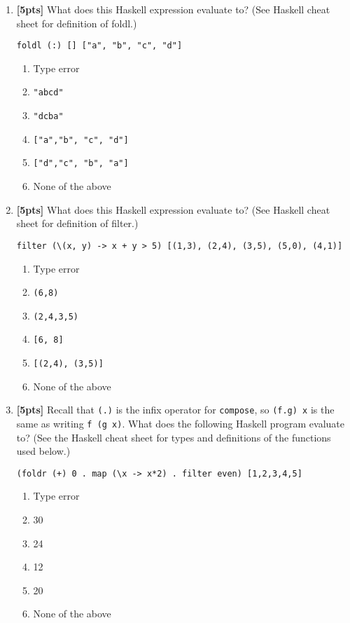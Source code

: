 \documentclass[paper=letter, fontsize=13pt]{article} %
\numberwithin{equation}{section} %
\newif\ifshowanswers\showanswersfalse
\begin{document}
\begin{enumerate}
\item \textbf{[5pts]}  What does this Haskell expression evaluate to?
  (See Haskell cheat sheet for definition of foldl.)
\begin{lstlisting}
foldl (:) [] ["a", "b", "c", "d"]
\end{lstlisting}
  \begin{enumerate}
    \item Type error
    \item \verb|"abcd"|
    \item \verb|"dcba"|
    \item \verb|["a","b", "c", "d"]|
    \item \verb|["d","c", "b", "a"]|
    \item None of the above
  \end{enumerate}

\item \textbf{[5pts]}  What does this Haskell expression evaluate to?
  (See Haskell cheat sheet for definition of filter.)
\begin{lstlisting}
filter (\(x, y) -> x + y > 5) [(1,3), (2,4), (3,5), (5,0), (4,1)]
\end{lstlisting}
  \begin{enumerate}
    \item Type error
    \item \verb|(6,8)|
    \item \verb|(2,4,3,5)|
    \item \verb|[6, 8]|
    \item \verb|[(2,4), (3,5)]|
    \item None of the above
  \end{enumerate}
\ifshowanswers
Answer: E
\fi

\item \textbf{[5pts]} 
Recall that \texttt{(.)} is the infix operator for \texttt{compose}, so \texttt{(f.g) x} is the same as writing \texttt{f (g x)}. 
What does the following Haskell program evaluate to? (See the Haskell cheat sheet for types and definitions 
of the functions used below.)
\begin{lstlisting}
(foldr (+) 0 . map (\x -> x*2) . filter even) [1,2,3,4,5]
\end{lstlisting}
  \begin{enumerate}
    \item Type error
    \item 30
    \item 24
    \item 12
    \item 20
    \item None of the above
  \end{enumerate}
\ifshowanswers
Answer: D
\fi
  

\end{enumerate}
\end{document}
